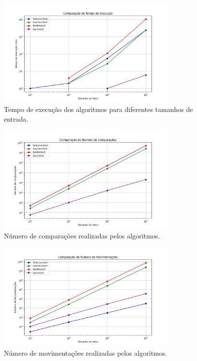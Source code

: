\documentclass[12pt]{article}
\begin{document}
	\begin{figure}[h]
		\centering
		\includegraphics[width=0.8\textwidth]{tempo_execucao.png}
		\caption{Tempo de execução dos algoritmos para diferentes tamanhos de entrada.}
		\label{fig:tempo}
	\end{figure}
	
	\begin{figure}[h]
		\centering
		\includegraphics[width=0.8\textwidth]{comparacoes.png}
		\caption{Número de comparações realizadas pelos algoritmos.}
		\label{fig:comparacoes}
	\end{figure}
	
	\begin{figure}[h]
		\centering
		\includegraphics[width=0.8\textwidth]{movimentacoes.png}
		\caption{Número de movimentações realizadas pelos algoritmos.}
		\label{fig:movimentacoes}
	\end{figure}
	
\end{document}
